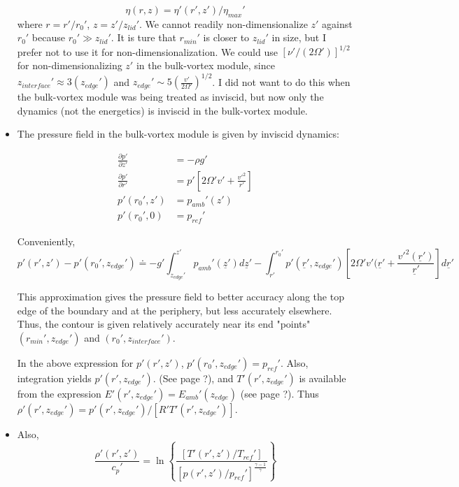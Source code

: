 \documentclass[preprint, prX]{revtex4}
\newcommand{\cbfrac}[2]{\left\{\frac{#1}{#2}\right\}}
\newcommand{\pd}[2]{\frac{\partial#1}{\partial#2}}
\begin{document}
\begin{itemize}
\begin{equation}
	\eta(r,z) = \eta'(r',z')/\eta_{max}'
\end{equation}
where $r = r'/r_0'$, $z=z'/z_{lid}'$. We cannot readily non-dimensionalize $z'$ against $r_0'$ because $r_0' \gg z_{lid}'$. It is ture that $r_{min}'$ is closer to $z_{lid}'$ in size, but I prefer not to use it for non-dimensionalization. We could use $[\nu'/(2\Omega')]^{1/2}$ for non-dimensionalizing $z'$ in the bulk-vortex module, since $z_{interface}' \approx 3(z_{edge}')$ and $z_{edge}' \sim 5 \left( \frac{v'}{2\Omega'}\right)^{1/2}$. I did not want to do this when the bulk-vortex module was being treated as inviscid, but now only the dynamics (not the energetics) is inviscid in the bulk-vortex module.

\item The pressure field in the bulk-vortex module is given by inviscid dynamics:

\begin{equation}
\begin{split}
	\pd{ p'}{ z'} &= -\rho g' \\
	\pd{ p'}{ r'} & = p'\left[ 2\Omega' v' + \frac{v'^2}{r'} \right ]\\
	p'(r_0',z') &= p_{amb}'(z') \\
	p'(r_0',0) &= p_{ref}'
\end{split}
\end{equation}

Conveniently,
\begin{equation}
	p'(r',z') - p'(r_0', z_{edge}') \doteq -g' \int_{z_{edge}'}^{z'} p_{amb}'(\underline{z}') d\underline{z}' - \int_{r'}^{r_0'} p'(\underline{r}', z_{edge}') \left[ 2\Omega'v'(\underline{r}' + \frac{v'^2(\underline{r}')}{\underline{r}'}\right] d\underline{r}'
\end{equation}

This approximation gives the pressure field to better accuracy along the top edge of the boundary and at the periphery, but less accurately elsewhere. Thus, the contour is given relatively accurately near its end "points" $(r_{min}', z_{edge}')$ and $(r_0', z_{interface}')$.

In the above expression for $p'(r',z')$, $p'(r_0', z_{edge}') = p_{ref}'$. Also, integration yields $p'(r',z_{edge}')$. (See page ?), and $T'(r',z_{edge}')$ is available from the expression $E'(r',z_{edge}') = E_{amb}'(z_{edge})$ (see page ?). Thus $\rho'(r',z_{edge}') = p'(r',z_{edge}')/[R' T'(r',z_{edge}')]$.

\item Also, 
\begin{equation}
	\frac{\rho'(r',z')}{c_p'} = \ln \cbfrac{ \left[ T'(r',z')/T_{ref}'\right] }{\left[ p(r',z')/p_{ref}' \right]^\frac{\gamma-1}{\gamma} }
\end{equation}


\end{itemize}
\end{document}
